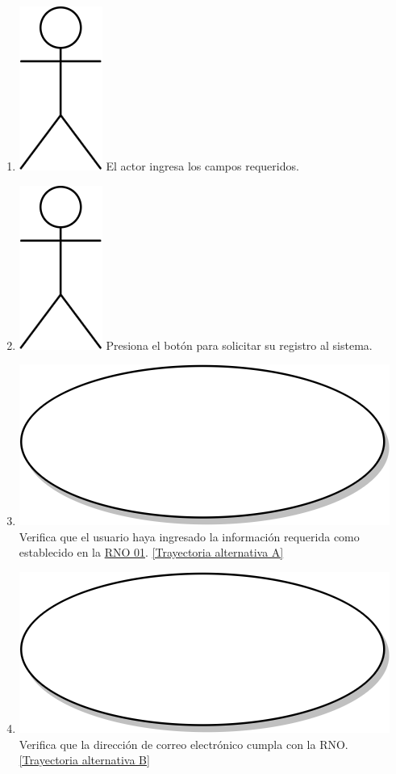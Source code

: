 \begin{enumerate}
  \item {\includegraphics[scale=.1]{Capitulo3/img/actor.png} El actor ingresa los campos requeridos.}
  \item {\includegraphics[scale=.1]{Capitulo3/img/actor.png} Presiona el botón para solicitar su registro al sistema.}
  \item {\includegraphics[scale=.05]{Capitulo3/img/proceso.png} Verifica que el usuario haya ingresado la información requerida como establecido en la \hyperref[rno_01]{RNO 01}. \hyperref[cu2_ta_a]{[Trayectoria alternativa A]}}
  \item {\includegraphics[scale=.05]{Capitulo3/img/proceso.png} Verifica que la dirección de correo electrónico cumpla con la RNO. \hyperref[cu2_ta_b]{[Trayectoria alternativa B]}}

\end{enumerate}
